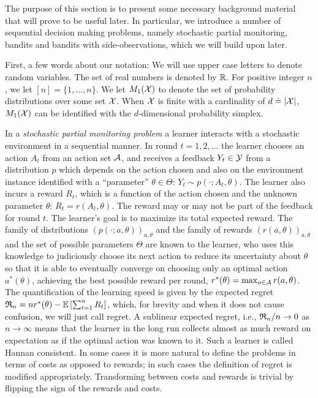 
The purpose of this section is to present some necessary background material that will prove to be useful later.
In particular, we introduce a number of sequential decision making problems,
namely stochastic partial monitoring, bandits and bandits with side-observations, which we will build upon later.

First, a few words about our notation:
We will use upper case letters to denote random variables.
The set of real numbers is denoted by $\mathbb{R}$. For positive integer $n$, we let
$[n] = \{1,\dots,n\}$. %
We let $M_1(\mathcal{X})$ to denote the set of probability distributions over some set $\mathcal{X}$.
When $\mathcal{X}$ is finite with a cardinality of $d \doteq |\mathcal{X}|$, 
$M_1(\mathcal{X})$ can be identified with the $d$-dimensional probability simplex.

In a \emph{stochastic partial monitoring problem} a learner interacts with a stochastic environment in a sequential manner.
In round $t=1,2,\dots$ the learner chooses an action $A_t$ from an action set $\mathcal{A}$, and receives a feedback $Y_t\in \mathcal{Y}$
from a distribution $p$ which depends on the action chosen and also on the environment instance identified
with a ``parameter'' $\theta\in\Theta$:
$Y_t \sim p(\cdot;A_t,\theta)$. 
The learner also incurs a reward $R_t$, which is a function of the action chosen and the unknown parameter $\theta$:
$R_t = r(A_t,\theta)$. 
The reward may or may not be part of the feedback for round $t$.
The learner's goal is to maximize its total expected reward.
The family of distributions $(p(\cdot;a,\theta))_{a,\theta}$ and the family of rewards $(r(a,\theta))_{a,\theta}$
and the set of possible parameters $\Theta$ are known to the learner, who uses this knowledge to judiciously choose
its next action to reduce its uncertainty about $\theta$ so that it is able to eventually converge on choosing only an 
optimal action $a^*(\theta)$, achieving the best possible reward per round, $r^*(\theta) = \max_{a\in \mathcal{A}} r(a,\theta)$.
The quantification of the learning speed is given by the expected regret 
$\mathfrak{R}_n = n r^*(\theta) - \mathbb{E}\left[\sum_{t=1}^n R_t\right]$, which, for brevity and when it does not cause confusion, 
we will just call regret.
A sublinear expected regret, i.e., $\mathfrak{R}_n/n \to 0$ as $n\to \infty$ means that the learner in the long run collects
almost as much reward on expectation as if the optimal action was known to it.
Such a learner is called Hannan consistent. 
In some cases it is more natural to define the problems in terms of costs as opposed to rewards;
in such cases the definition of regret is modified appropriately. 
Transforming between costs and rewards is trivial by flipping the sign of the rewards and costs.

